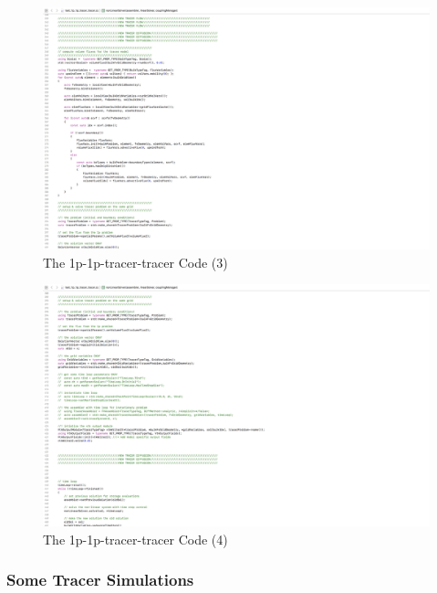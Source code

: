 \begin{figure}[h]
\centering
\includegraphics[width=350mm]{1p_1p_tracer_tracer_3}
\caption{\footnotesize The 1p-1p-tracer-tracer Code (3)}
\label{fig:1p-1p-tracer-tracer-3}
\end{figure}
\begin{figure}[h]
\centering
\includegraphics[width=350mm]{1p_1p_tracer_tracer_4}
\caption{\footnotesize The 1p-1p-tracer-tracer Code (4)}
\label{fig:1p-1p-tracer-tracer-4}
\end{figure}


\subsubsection*{Some Tracer Simulations}
\label{Tracer}

